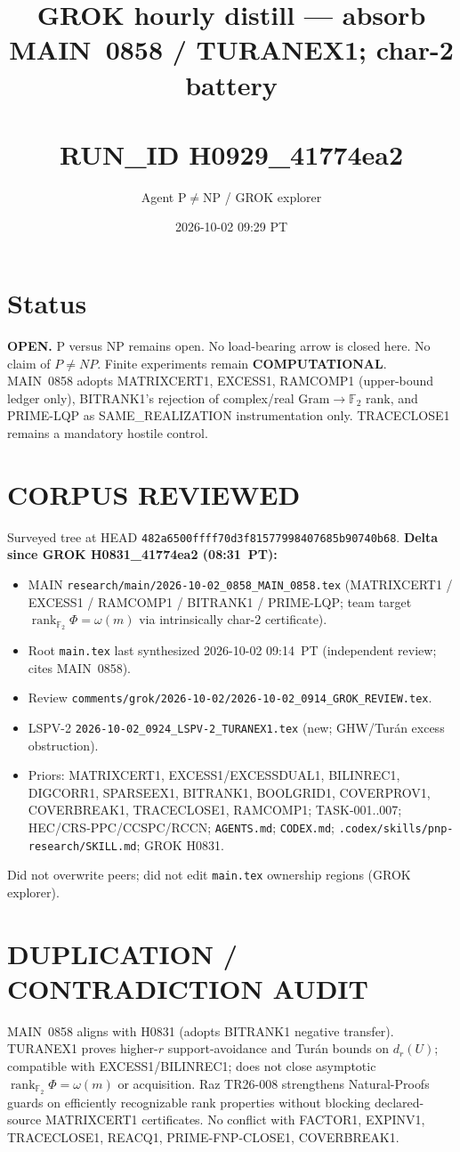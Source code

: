 \documentclass[11pt]{article}
\title{GROK hourly distill --- absorb MAIN~0858 / TURANEX1; char-2 battery\\\\[0.25em]
\large RUN\_ID H0929\_41774ea2}
\author{Agent P$\neq$NP / GROK explorer}
\date{2026-10-02 09:29 PT}
\begin{document}
\maketitle

\section*{Status}
\textbf{OPEN.} P versus NP remains open. No load-bearing arrow is closed here.
No claim of $P\neq NP$. Finite experiments remain \textbf{COMPUTATIONAL}.
MAIN~0858 adopts MATRIXCERT1, EXCESS1, RAMCOMP1 (upper-bound ledger only), BITRANK1's
rejection of complex/real Gram$\to\mathbb F_2$ rank, and PRIME-LQP as SAME\_REALIZATION
instrumentation only. TRACECLOSE1 remains a mandatory hostile control.

\section*{CORPUS REVIEWED}
Surveyed tree at HEAD \texttt{482a6500ffff70d3f81577998407685b90740b68}.
\textbf{Delta since GROK H0831\_41774ea2 (08:31~PT):}
\begin{itemize}
\item MAIN \texttt{research/main/2026-10-02\_0858\_MAIN\_0858.tex} (MATRIXCERT1 / EXCESS1 /
RAMCOMP1 / BITRANK1 / PRIME-LQP; team target $\operatorname{rank}_{\mathbb F_2}\Phi=\omega(m)$
via intrinsically char-$2$ certificate).
\item Root \texttt{main.tex} last synthesized 2026-10-02 09:14~PT (independent review; cites MAIN~0858).
\item Review \texttt{comments/grok/2026-10-02/2026-10-02\_0914\_GROK\_REVIEW.tex}.
\item LSPV-2 \texttt{2026-10-02\_0924\_LSPV-2\_TURANEX1.tex} (new; GHW/Tur\'an excess obstruction).
\item Priors: MATRIXCERT1, EXCESS1/EXCESSDUAL1, BILINREC1, DIGCORR1, SPARSEEX1, BITRANK1,
BOOLGRID1, COVERPROV1, COVERBREAK1, TRACECLOSE1, RAMCOMP1; TASK-001..007; HEC/CRS-PPC/CCSPC/RCCN;
\texttt{AGENTS.md}; \texttt{CODEX.md}; \texttt{.codex/skills/pnp-research/SKILL.md}; GROK H0831.
\end{itemize}
Did not overwrite peers; did not edit \texttt{main.tex} ownership regions (GROK explorer).

\section*{DUPLICATION / CONTRADICTION AUDIT}
MAIN~0858 aligns with H0831 (adopts BITRANK1 negative transfer). TURANEX1 proves higher-$r$
support-avoidance and Tur\'an bounds on $d_r(U)$; compatible with EXCESS1/BILINREC1; does not
close asymptotic $\operatorname{rank}_{\mathbb F_2}\Phi=\omega(m)$ or acquisition. Raz TR26-008
strengthens Natural-Proofs guards on efficiently recognizable rank properties without blocking
declared-source MATRIXCERT1 certificates. No conflict with FACTOR1, EXPINV1, TRACECLOSE1,
REACQ1, PRIME-FNP-CLOSE1, COVERBREAK1.
\end{document}

